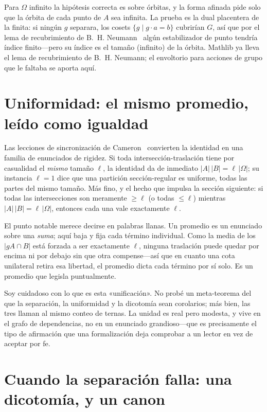 \documentclass[11pt]{article}
\begin{document}
Para $\Omega$ infinito la hipótesis correcta es sobre órbitas, y la forma afinada
pide solo que la órbita de cada punto de $A$ sea infinita. La prueba es la dual
placentera de la finita: si ningún $g$ separara, los cosets $\{g\mid g\cdot a=b\}$
cubrirían $G$, así que por el lema de recubrimiento de B.~H.
Neumann~\cite{BHNeumann1954} algún estabilizador de punto tendría índice finito---pero
su índice es el tamaño (infinito) de la órbita. Mathlib ya lleva el lema de
recubrimiento de B.~H. Neumann; el envoltorio para acciones de grupo que le faltaba
se aporta aquí.

\section{Uniformidad: el mismo promedio, leído como igualdad}
\label{sec:engine}

Las lecciones de sincronización de Cameron~\cite{CameronSync} convierten la identidad
en una familia de enunciados de rigidez. Si toda intersección-traslación tiene por
casualidad el \emph{mismo} tamaño $\ell$, la identidad da de inmediato
$|A|\,|B|=\ell\,|\Omega|$; su instancia $\ell=1$ dice que una partición
sección-regular es uniforme, todas las partes del mismo tamaño. Más fino, y el hecho
que impulsa la sección siguiente: si todas las intersecciones son meramente $\ge\ell$
(o todas $\le\ell$) mientras $|A|\,|B|=\ell\,|\Omega|$, entonces cada una vale
exactamente $\ell$.

El punto notable merece decirse en palabras llanas. Un promedio es un enunciado sobre
una \emph{suma}; aquí baja y fija cada término individual. Como la media de los
$|gA\cap B|$ está forzada a ser exactamente $\ell$, ninguna traslación puede quedar
por encima ni por debajo sin que otra compense---así que en cuanto una cota unilateral
retira esa libertad, el promedio dicta cada término por sí solo. Es un promedio que
legisla puntualmente.

Soy cuidadoso con lo que es esta «unificación». No probé un meta-teorema del que la
separación, la uniformidad y la dicotomía sean corolarios; más bien, las tres llaman
al mismo conteo de ternas. La unidad es real pero modesta, y vive en el grafo de
dependencias, no en un enunciado grandioso---que es precisamente el tipo de afirmación
que una formalización deja comprobar a un lector en vez de aceptar por fe.

\section{Cuando la separación falla: una dicotomía, y un canon}
\label{sec:dichotomy}
\end{document}
